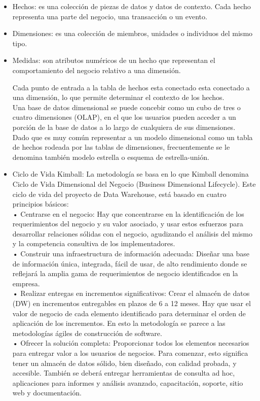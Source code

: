 \documentclass[preprint,12pt]{elsarticle}
\begin{document}
			\begin{itemize}
				\item Hechos: es una colección de piezas de datos y datos de contexto. Cada hecho representa una parte del negocio, una transacción o un evento.
				\item Dimensiones: es una colección de miembros, unidades o individuos del mismo tipo.
				\item Medidas: son atributos numéricos de un hecho que representan el comportamiento del negocio relativo a una dimensión.
				
				Cada punto de entrada a la tabla de hechos esta conectado esta conectado a una dimensión, lo que permite determinar el contexto de los hechos.\\
Una base de datos dimensional se puede concebir como un cubo de tres o cuatro dimensiones (OLAP), en el que los usuarios pueden acceder a un porción de la base de datos a lo largo de cualquiera de sus dimensiones.\\
Dado que es muy común representar a un modelo dimensional como un tabla de hechos rodeada por las tablas de dimensiones, frecuentemente se le denomina también modelo estrella o esquema de estrella-unión.\\

			\end{itemize}
			
\begin{itemize}

			\item Ciclo de Vida Kimball:
			La metodología se basa en lo que Kimball denomina Ciclo de Vida Dimensional del Negocio (Business Dimensional Lifecycle). Este ciclo de vida del proyecto de Data Warehouse, está basado en cuatro principios básicos: \\
•	Centrarse en el negocio: Hay que concentrarse en la identificación de los requerimientos del negocio y su valor asociado, y usar estos esfuerzos para desarrollar relaciones sólidas con el negocio, agudizando el análisis del mismo y la competencia consultiva de los implementadores. \\
•	Construir una infraestructura de información adecuada: Diseñar una base de información única, integrada, fácil de usar, de alto rendimiento donde se reflejará la amplia gama de requerimientos de negocio identificados en la empresa. \\
•	Realizar entregas en incrementos significativos: Crear el almacén de datos (DW) en incrementos entregables en plazos de 6 a 12 meses. Hay que usar el valor de negocio de cada elemento identificado para determinar el orden de aplicación de los incrementos. En esto la metodología se parece a las metodologías ágiles de construcción de software. \\
•	Ofrecer la solución completa: Proporcionar todos los elementos necesarios para entregar valor a los usuarios de negocios. Para comenzar, esto significa tener un almacén de datos sólido, bien diseñado, con calidad probada, y accesible. También se deberá entregar herramientas de consulta ad hoc, aplicaciones para informes y análisis avanzado, capacitación, soporte, sitio web y documentación.

			\end{itemize}
\end{document}
